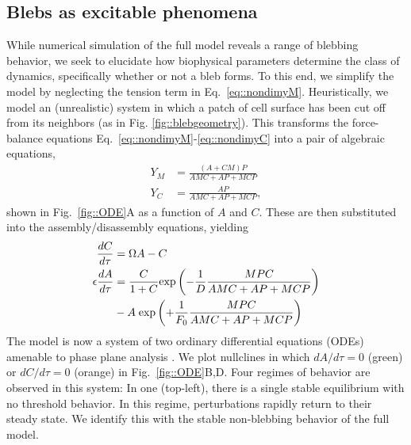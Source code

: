 \subsection{Blebs as excitable phenomena}

While numerical simulation of the full model reveals a range of blebbing behavior, we seek to elucidate how biophysical parameters determine the class of dynamics, specifically whether or not a bleb forms. To this end, we simplify the model by neglecting the tension term in Eq.~\ref{eq::nondimyM}. Heuristically, we model an (unrealistic) system in which a patch of cell surface has been cut off from its neighbors (as in Fig. \ref{fig::blebgeometry}). This transforms the force-balance equations Eq.~\ref{eq::nondimyM}-\ref{eq::nondimyC} into a pair of algebraic equations,
\begin{align}
Y_M &= \frac{(A+CM)P}{A MC + AP + MCP}\label{eq::ODEyM}\\
Y_C &= \frac{AP}{A MC + AP + MCP}\label{eq::ODEyC},
\end{align}
shown in Fig.~\ref{fig::ODE}A as a function of $A$ and $C$. These are then substituted into the assembly/disassembly equations, yielding
\begin{align}
\frac{d C}{d \tau} &= \Omega A - C \label{eq::ODEC}\\
\epsilon \frac{d A}{d \tau} &= \frac{C}{1+C} \mbox{exp}\left( -\frac{1}{D} \frac{MP C}{A MC + AP + MCP}\right) \notag\\
 &- A\; \mbox{exp}\left( + \frac{1}{F_0}\frac{MP C}{A MC + AP + MCP}\right) \label{eq::ODEA}
\end{align}
The model is now a system of two ordinary differential equations (ODEs) amenable to phase plane analysis \cite{Keshet}. We plot nullclines in which $dA/d\tau=0$ (green) or $dC/d\tau=0$ (orange) in Fig.~\ref{fig::ODE}B,D.
Four regimes of behavior are observed in this system: 
In one (top-left), there is a single stable equilibrium with no threshold behavior. In this regime, perturbations rapidly return to their steady state. We identify this with the stable non-blebbing behavior of the full model. 

